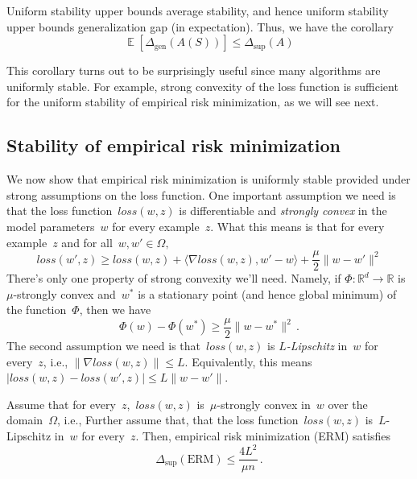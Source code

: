 \documentclass{tufte-book}
\begin{document}
Uniform stability upper bounds average stability, and hence uniform
stability upper bounds generalization gap (in expectation). Thus, we
have the corollary \[
\mathop\mathbb{E}[\Delta_{\mathrm{gen}}(A(S))] \leq \Delta_{\mathrm{sup}} (A)
\]

This corollary turns out to be surprisingly useful since many algorithms
are uniformly stable. For example, strong convexity of the loss function
is sufficient for the uniform stability of empirical risk minimization,
as we will see next.

\hypertarget{stability-of-empirical-risk-minimization}{%
\subsection{Stability of empirical risk
minimization}\label{stability-of-empirical-risk-minimization}}

We now show that empirical risk minimization is uniformly stable
provided under strong assumptions on the loss function. One important
assumption we need is that the loss function~\(\mathit{loss}(w, z)\) is
differentiable and \emph{strongly convex} in the model parameters~\(w\)
for every example~\(z.\) What this means is that for every example~\(z\)
and for all~\(w,w'\in\Omega,\) \[
\mathit{loss}(w',z)\ge
\mathit{loss}(w,z)
+ \langle\nabla \mathit{loss}(w,z), w' - w\rangle
+ \frac{\mu}2\|w-w'\|^2
\] There's only one property of strong convexity we'll need. Namely, if
\(\Phi\colon\mathbb{R}^d\to\mathbb{R}\) is~\(\mu\)-strongly convex
and~\(w^*\) is a stationary point (and hence global minimum) of the
function~\(\Phi\), then we have \[
\Phi(w) - \Phi(w^*) \geq \frac{\mu}{2} \| w - w^* \|^2\,.
\] The second assumption we need is that~\(\mathit{loss}(w, z)\) is
\emph{\(L\)-Lipschitz} in~\(w\) for every~\(z\), i.e.,
\(\|\nabla \mathit{loss}(w, z)\|\le L\). Equivalently, this means
\(|\mathit{loss}(w, z)-\mathit{loss}(w',z)|\le L\|w-w'\|.\)

\begin{Theorem}

Assume that for every~\(z\),~\(\mathit{loss}(w, z)\) is~\(\mu\)-strongly
convex in~\(w\) over the domain~\(\Omega\), i.e., Further assume that,
that the loss function~\(\mathit{loss}(w, z)\) is~\(L\)-Lipschitz
in~\(w\) for every~\(z.\) Then, empirical risk minimization (ERM)
satisfies \[
\Delta_{\mathrm{sup}} (\text{ERM}) \leq \frac{4L^2}{\mu n}\,.
\]

\end{Theorem}
\end{document}
